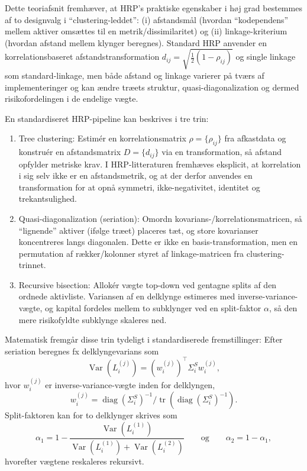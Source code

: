 \documentclass[../main.tex]{subfiles}
\begin{document}
Dette teoriafsnit fremhæver, at HRP's praktiske egenskaber i høj grad bestemmes af to designvalg i ``clustering-leddet'': (i) afstandsmål (hvordan ``kodependens'' mellem aktiver omsættes til en metrik/dissimilaritet) og (ii) linkage-kriterium (hvordan afstand mellem klynger beregnes). Standard HRP anvender en korrelationsbaseret afstandstransformation $d_{ij}=\sqrt{\frac{1}{2}(1-\rho_{ij})}$ og single linkage som standard-linkage, men både afstand og linkage varierer på tværs af implementeringer og kan ændre træets struktur, quasi-diagonalization og dermed risikofordelingen i de endelige vægte.~\cite{lopez_de_prado_building_2016,trucios_hrp_portfolio_nodate,kaae_karppinen_hierarchical_2022}

En standardiseret HRP-pipeline kan beskrives i tre trin:
\begin{enumerate}
    \item Tree clustering: Estimér en korrelationsmatrix $\rho=\{\rho_{ij}\}$ fra afkastdata og konstruér en afstandsmatrix $D=\{d_{ij}\}$ via en transformation, så afstand opfylder metriske krav. I HRP-litteraturen fremhæves eksplicit, at korrelation i sig selv ikke er en afstandsmetrik, og at der derfor anvendes en transformation for at opnå symmetri, ikke-negativitet, identitet og trekantsulighed.~\cite{lopez_de_prado_building_2016,kaae_karppinen_hierarchical_2022}
    \item Quasi-diagonalization (seriation): Omordn kovarians-/korrelationsmatricen, så ``lignende'' aktiver (ifølge træet) placeres tæt, og store kovarianser koncentreres langs diagonalen. Dette er ikke en basis-transformation, men en permutation af rækker/kolonner styret af linkage-matricen fra clustering-trinnet.~\cite{kaae_karppinen_hierarchical_2022}
    \item Recursive bisection: Allokér vægte top-down ved gentagne splits af den ordnede aktivliste. Variansen af en delklynge estimeres med inverse-variance-vægte, og kapital fordeles mellem to subklynger ved en split-faktor $\alpha$, så den mere risikofyldte subklynge skaleres ned.~\cite{kaae_karppinen_hierarchical_2022}
\end{enumerate}

Matematisk fremgår disse trin tydeligt i standardiserede fremstillinger: Efter seriation beregnes fx delklyngevarians som
\[
    \operatorname{Var}(L_i^{(j)})=(w_i^{(j)})^\top \Sigma_i^S w_i^{(j)},
\]
hvor $w_i^{(j)}$ er inverse-variance-vægte inden for delklyngen,
\[
    w_i^{(j)}=\operatorname{diag}(\Sigma_i^S)^{-1}/\operatorname{tr}(\operatorname{diag}(\Sigma_i^S)^{-1}).
\]
Split-faktoren kan for to delklynger skrives som
\[
    \alpha_1=1-\frac{\operatorname{Var}(L_i^{(1)})}{\operatorname{Var}(L_i^{(1)})+\operatorname{Var}(L_i^{(2)})}
    \qquad \text{og} \qquad
    \alpha_2=1-\alpha_1,
\]
hvorefter vægtene reskaleres rekursivt.~\cite{kaae_karppinen_hierarchical_2022}
\end{document}
